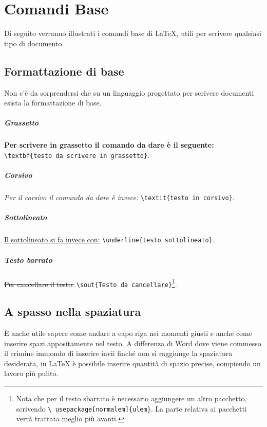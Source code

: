 \chapter{Comandi Base}

Di seguito verranno illustrati i comandi base di \LaTeX{}, utili per scrivere 
qualsiasi tipo di documento.

\section{Formattazione di base}

Non c'è da sorprendersi che su un linguaggio progettato per scrivere documenti 
esista la formattazione di base.

\paragraph*{Grassetto} \textbf{Per scrivere in grassetto il comando da dare è 
il seguente: }\verb!\textbf{testo da scrivere in grassetto}!.

\paragraph*{Corsivo} \textit{Per il corsivo il comando da dare è invece: }
\verb!\textit{testo in corsivo}!.

\paragraph*{Sottolineato} \underline{Il sottolineato si fa invece con:} 
\verb!\underline{testo sottolineato}!.

\paragraph*{Testo barrato} \sout{Per cancellare il testo: }
\verb!\sout{Testo da cancellare}!\footnote{Nota che per il testo sbarrato è 
necessario aggiungere un altro pacchetto, scrivendo \texttt{\textbackslash 
usepackage[normalem]\{ulem\}}. La parte relativa ai pacchetti verrà trattata 
meglio più avanti.}.

\section{A spasso nella spaziatura}

È anche utile sapere come andare a capo riga nei momenti giusti e anche come 
inserire spazi appositamente nel testo. A differenza di Word dove viene 
commesso il crimine immondo di inserire invii finché non si raggiunge la 
spaziatura desiderata, in \LaTeX{} è possibile inserire quantità di spazio 
precise, compiendo un lavoro più pulito.

